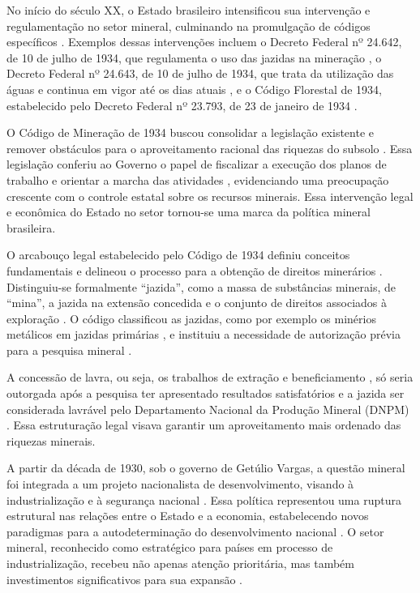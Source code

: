 No início do século XX, o Estado brasileiro intensificou sua intervenção e regulamentação no setor mineral, culminando na promulgação de códigos específicos \cite{domingues2022}. Exemplos dessas intervenções incluem o Decreto Federal nº 24.642, de 10 de julho de 1934, que regulamenta o uso das jazidas na mineração \cite{brasil1934b}, o Decreto Federal nº 24.643, de 10 de julho de 1934, que trata da utilização das águas e continua em vigor até os dias atuais \cite{brasil1934c}, e o Código Florestal de 1934, estabelecido pelo Decreto Federal nº 23.793, de 23 de janeiro de 1934 \cite{brasil1934a}. 

O Código de Mineração de 1934 buscou consolidar a legislação existente e remover obstáculos para o aproveitamento racional das riquezas do subsolo \cite{brasil1934b}. Essa legislação conferiu ao Governo o papel de fiscalizar a execução dos planos de trabalho e orientar a marcha das atividades \cite{brasil1934b, domingues2022}, evidenciando uma preocupação crescente com o controle estatal sobre os recursos minerais. Essa intervenção legal e econômica do Estado no setor tornou-se uma marca da política mineral brasileira.

O arcabouço legal estabelecido pelo Código de 1934 definiu conceitos fundamentais e delineou o processo para a obtenção de direitos minerários \cite{brasil1934b}. Distinguiu-se formalmente ``jazida'', como a massa de substâncias minerais, de ``mina'', a jazida na extensão concedida e o conjunto de direitos associados à exploração \cite{brasil1934b}. O código classificou as jazidas, como por exemplo os minérios metálicos em jazidas primárias \cite{brasil1934b}, e instituiu a necessidade de autorização prévia para a pesquisa mineral \cite{barreto2001}. 

A concessão de lavra, ou seja, os trabalhos de extração e beneficiamento \cite{brasil1934b}, só seria outorgada após a pesquisa ter apresentado resultados satisfatórios e a jazida ser considerada lavrável pelo Departamento Nacional da Produção Mineral (DNPM) \cite{brasil1934b}. Essa estruturação legal visava garantir um aproveitamento mais ordenado das riquezas minerais.

A partir da década de 1930, sob o governo de Getúlio Vargas, a questão mineral foi integrada a um projeto nacionalista de desenvolvimento, visando à industrialização e à segurança nacional \cite{villasboas1995, fonseca2012, domingues2022}. Essa política representou uma ruptura estrutural nas relações entre o Estado e a economia, estabelecendo novos paradigmas para a autodeterminação do desenvolvimento nacional \cite{villasboas1995}. O setor mineral, reconhecido como estratégico para países em processo de industrialização, recebeu não apenas atenção prioritária, mas também investimentos significativos para sua expansão \cite{villasboas1995}.

